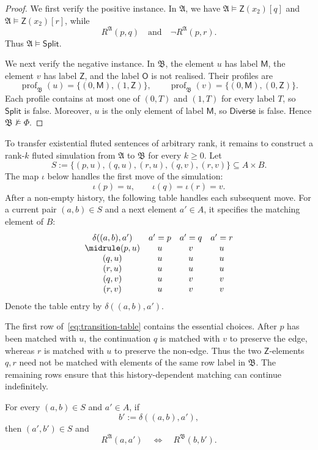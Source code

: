 \documentclass{lmcs}
\newcommand{\A}{\mathfrak{A}}
\newcommand{\B}{\mathfrak{B}}
\newcommand{\Zt}{\mathsf{Z}}
\newcommand{\Ot}{\mathsf{O}}
\newcommand{\Mt}{\mathsf{M}}
\newcommand{\prof}{\operatorname{prof}}
\begin{document}
\begin{proof}
We first verify the positive instance.  In \(\A\), we have \(\A\models\Zt(x_2)[q]\) and \(\A\models\Zt(x_2)[r]\), while
\[
  R^{\A}(p,q)
  \quad\text{and}\quad
  \neg R^{\A}(p,r).
\]
Thus \(\A\models\mathsf{Split}\).

We next verify the negative instance.  In \(\B\), the element \(u\) has
label \(\Mt\), the element \(v\) has label \(\Zt\), and the label \(\Ot\)
is not realised.  Their profiles are
\[
  \prof_{\B}(u)=\{(0,\Mt),(1,\Zt)\},
  \qquad
  \prof_{\B}(v)=\{(0,\Mt),(0,\Zt)\}.
\]
Each profile contains at most one of \((0,T)\) and \((1,T)\) for every
label \(T\), so \(\mathsf{Split}\) is false.  Moreover, \(u\) is the only
element of label \(\Mt\), so \(\mathsf{Diverse}\) is false.  Hence
\(\B\not\models\Phi\).
\end{proof}

To transfer existential fluted sentences of arbitrary rank, it remains to
construct a rank-$k$ fluted simulation from \(\A\) to \(\B\) for every
$k\geq0$.  Let
\[
  S:=\{(p,u),(q,u),(r,u),(q,v),(r,v)\}\subseteq A\times B.
\]
The map \(\iota\) below handles the first move of the simulation:
\[
  \iota(p)=u,
  \qquad
  \iota(q)=\iota(r)=v.
\]
After a non-empty history, the following table handles each subsequent move.
For a current pair \((a,b)\in S\) and a next element \(a'\in A\), it specifies
the matching element of \(B\):
\begin{equation}
\begin{array}{cccc}
  \delta((a,b),a')&a'=p&a'=q&a'=r\\ \midrule
  (p,u)&u&v&u\\
  (q,u)&u&u&u\\
  (r,u)&u&u&u\\
  (q,v)&u&v&v\\
  (r,v)&u&v&v
\end{array}
\label{eq:transition-table}
\end{equation}
Denote the table entry by \(\delta((a,b),a')\).

The first row of~\eqref{eq:transition-table} contains the essential choices.
After \(p\) has been matched with \(u\), the continuation \(q\) is matched
with \(v\) to preserve the edge, whereas \(r\) is matched with \(u\) to
preserve the non-edge.  Thus the two \(\Zt\)-elements \(q,r\) need not be
matched with elements of the same row label in \(\B\).  The remaining rows
ensure that this history-dependent matching can continue indefinitely.

\begin{lem}
\label{lem:transition}
For every \((a,b)\in S\) and \(a'\in A\), if
\[
  b':=\delta((a,b),a'),
\]
then \((a',b')\in S\) and
\begin{equation}
  R^{\A}(a,a')
  \quad\Longleftrightarrow\quad
  R^{\B}(b,b').
  \label{eq:edge-match}
\end{equation}
\end{lem}
\end{document}
